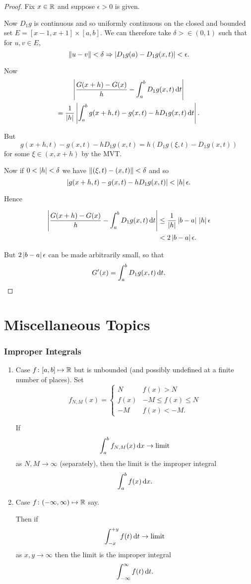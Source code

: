 \documentclass{notes}
\theoremstyle{plain}
\begin{document}
\begin{proof}
Fix $ x \in \mathbb{R} $ and suppose $ \epsilon>0 $ is given.

Now $ D_{1}g $ is continuous and so uniformly continuous on the 
closed and bounded set $E=[x-1,x+1] \times [a,b]$.
We can therefore take $ \delta> \in (0,1)$ such that for $ u,v \in E $,
\[ \left\|u-v\right\|< \delta \Rightarrow \left|D_{1}g(a)-D_{1}g(x,t)\right| < 
\epsilon. \]

Now 
\begin{multline*}
\left|\frac{G(x+h)-G(x)}{h} - \int_{a}^{b}D_{1}g(x,t)\,\mathrm{d} t \right| \\
= \frac{1}{\left|h\right|} \left| \int_{a}^{b}g(x+h,t)-g(x,t)-hD_{1}g(x,t)\,\mathrm{d} t\right|.
\end{multline*}

But
\[ g(x+h,t)-g(x,t)-hD_{1}g(x,t) = h(D_{1}g(\xi,t)-D_{1}g(x,t)) \]
for some $ \xi \in (x, x+h) $ by the MVT.

Now if $ 0< \left|h\right| < \delta $ we have $\left\|(\xi,t)-(x,t)\right\| < \delta$
and so
\[
\left|g(x+h,t)-g(x,t)-hD_{1}g(x,t)\right| < \left|h\right| \epsilon.
\]

Hence

\begin{align*}
\left|\frac{G(x+h)-G(x)}{h}-\int_{a}^{b}D_{1}g(x,t)\,\mathrm{d} t\right| &
\leq \frac{1}{\left|h\right|} \left|b-a\right| \, \left|h\right| \epsilon \\
& < 2 \left|b-a\right| \epsilon.
\end{align*}

But $ 2 \left|b-a\right|\epsilon $ can be made arbitrarily small, so that
\[
G'(x) = \int_{a}^{b}D_{1}g(x,t)\,\mathrm{d} t.
\]
\end{proof}

\section{Miscellaneous Topics}

\subsubsection{Improper Integrals}
\begin{enumerate}
\item
Case $ f\colon [a,b] \mapsto \mathbb{R} $ but is unbounded (and possibly 
undefined at a finite number of places). Set
\[ f_{N,M}(x) =
\begin{cases}
N& f(x)>N \\
f(x)& -M\leq f(x) \leq N \\
-M& f(x) < -M.
\end{cases} \]

If
\[
\int_{a}^{b}f_{N,M}(x)\,\mathrm{d} x \to \text{limit}
\]
as $ N,M \to \infty $ (separately), then the limit is the 
improper integral
\[
\int_{a}^{b}f(x)\,\mathrm{d} x.
\]

\item  Case $ f\colon (-\infty, \infty) \mapsto \mathbb{R} $ say.

Then if
\[
\int_{-x}^{+y}f(t)\,\mathrm{d} t \to \text{limit}
\]
as $ x,y \to \infty $ then the limit is the improper integral
\[ \int_{-\infty}^{\infty}f(t)\,\mathrm{d} t.
\]
\end{enumerate}
\end{document}
